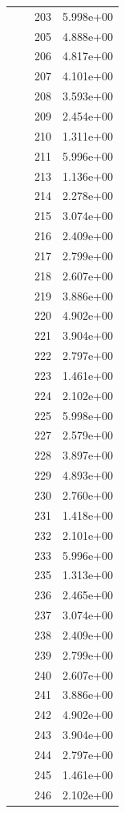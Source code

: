\documentclass[12pt]{article}
\begin{document}
\begin{longtable}{@{}cccc@{}}
 &  & 203 & 5.998e+00 \\
 &  & 205 & 4.888e+00 \\
 &  & 206 & 4.817e+00 \\
 &  & 207 & 4.101e+00 \\
 &  & 208 & 3.593e+00 \\
 &  & 209 & 2.454e+00 \\
 &  & 210 & 1.311e+00 \\
 &  & 211 & 5.996e+00 \\
 &  & 213 & 1.136e+00 \\
 &  & 214 & 2.278e+00 \\
 &  & 215 & 3.074e+00 \\
 &  & 216 & 2.409e+00 \\
 &  & 217 & 2.799e+00 \\
 &  & 218 & 2.607e+00 \\
 &  & 219 & 3.886e+00 \\
 &  & 220 & 4.902e+00 \\
 &  & 221 & 3.904e+00 \\
 &  & 222 & 2.797e+00 \\
 &  & 223 & 1.461e+00 \\
 &  & 224 & 2.102e+00 \\
 &  & 225 & 5.998e+00 \\
 &  & 227 & 2.579e+00 \\
 &  & 228 & 3.897e+00 \\
 &  & 229 & 4.893e+00 \\
 &  & 230 & 2.760e+00 \\
 &  & 231 & 1.418e+00 \\
 &  & 232 & 2.101e+00 \\
 &  & 233 & 5.996e+00 \\
 &  & 235 & 1.313e+00 \\
 &  & 236 & 2.465e+00 \\
 &  & 237 & 3.074e+00 \\
 &  & 238 & 2.409e+00 \\
 &  & 239 & 2.799e+00 \\
 &  & 240 & 2.607e+00 \\
 &  & 241 & 3.886e+00 \\
 &  & 242 & 4.902e+00 \\
 &  & 243 & 3.904e+00 \\
 &  & 244 & 2.797e+00 \\
 &  & 245 & 1.461e+00 \\
 &  & 246 & 2.102e+00 \\

\end{longtable}
\end{document}

